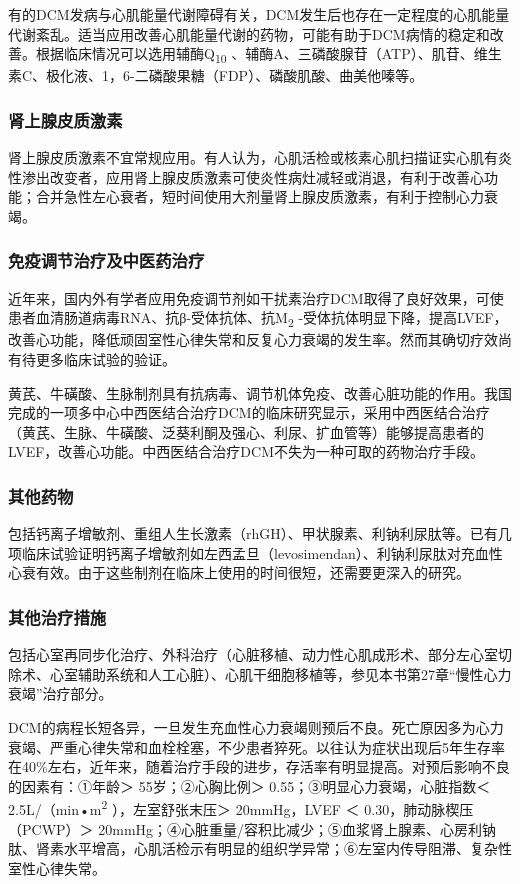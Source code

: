 有的DCM发病与心肌能量代谢障碍有关，DCM发生后也存在一定程度的心肌能量代谢紊乱。适当应用改善心肌能量代谢的药物，可能有助于DCM病情的稳定和改善。根据临床情况可以选用辅酶Q\textsubscript{10}
、辅酶A、三磷酸腺苷（ATP）、肌苷、维生素C、极化液、1，6-二磷酸果糖（FDP）、磷酸肌酸、曲美他嗪等。

\subsubsection{肾上腺皮质激素}

肾上腺皮质激素不宜常规应用。有人认为，心肌活检或核素心肌扫描证实心肌有炎性渗出改变者，应用肾上腺皮质激素可使炎性病灶减轻或消退，有利于改善心功能；合并急性左心衰者，短时间使用大剂量肾上腺皮质激素，有利于控制心力衰竭。

\subsubsection{免疫调节治疗及中医药治疗}

近年来，国内外有学者应用免疫调节剂如干扰素治疗DCM取得了良好效果，可使患者血清肠道病毒RNA、抗β-受体抗体、抗M\textsubscript{2}
-受体抗体明显下降，提高LVEF，改善心功能，降低顽固室性心律失常和反复心力衰竭的发生率。然而其确切疗效尚有待更多临床试验的验证。

黄芪、牛磺酸、生脉制剂具有抗病毒、调节机体免疫、改善心脏功能的作用。我国完成的一项多中心中西医结合治疗DCM的临床研究显示，采用中西医结合治疗（黄芪、生脉、牛磺酸、泛葵利酮及强心、利尿、扩血管等）能够提高患者的LVEF，改善心功能。中西医结合治疗DCM不失为一种可取的药物治疗手段。

\subsubsection{其他药物}

包括钙离子增敏剂、重组人生长激素（rhGH）、甲状腺素、利钠利尿肽等。已有几项临床试验证明钙离子增敏剂如左西孟旦（levosimendan）、利钠利尿肽对充血性心衰有效。由于这些制剂在临床上使用的时间很短，还需要更深入的研究。

\subsubsection{其他治疗措施}

包括心室再同步化治疗、外科治疗（心脏移植、动力性心肌成形术、部分左心室切除术、心室辅助系统和人工心脏）、心肌干细胞移植等，参见本书第27章“慢性心力衰竭”治疗部分。

DCM的病程长短各异，一旦发生充血性心力衰竭则预后不良。死亡原因多为心力衰竭、严重心律失常和血栓栓塞，不少患者猝死。以往认为症状出现后5年生存率在40\%左右，近年来，随着治疗手段的进步，存活率有明显提高。对预后影响不良的因素有：①年龄＞
55岁；②心胸比例＞ 0.55；③明显心力衰竭，心脏指数＜
2.5L/（min•m\textsuperscript{2} ），左室舒张末压＞ 20mmHg，LVEF ＜
0.30，肺动脉楔压（PCWP）＞
20mmHg；④心脏重量/容积比减少；⑤血浆肾上腺素、心房利钠肽、肾素水平增高，心肌活检示有明显的组织学异常；⑥左室内传导阻滞、复杂性室性心律失常。

